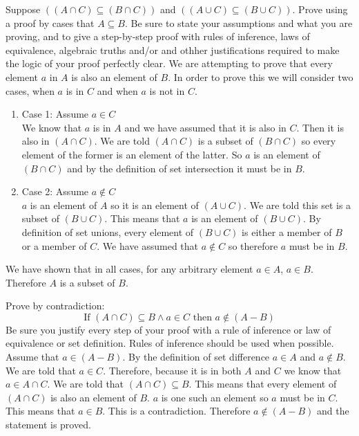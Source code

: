 \documentclass[paper=a4, fontsize=11pt]{jhwhw} %
\begin{document}
\problem{}
Suppose $((A\cap C) \subseteq (B\cap C))$ and $((A\cup C) \subseteq (B\cup C))$. Prove using a proof by cases that $A\subseteq B$. Be sure to state your assumptions and what you are proving, and to give a step-by-step proof with rules of inference, laws of equivalence, algebraic truths and/or and othher justifications required to make the logic of your proof perfectly clear.
\solution
We are attempting to prove that every element $a$ in $A$ is also an element of $B$. In order to prove this we will consider two cases, when $a$ is in $C$ and when $a$ is not in $C$. 
\begin{enumerate}
\item Case 1: Assume $a\in C$\\
We know that $a$ is in $A$ and we have assumed that it is also in $C$. Then it is also in $(A\cap C)$. We are told $(A\cap C)$ is a subset of $(B\cap C)$ so every element of the former is an element of the latter. So $a$ is an element of $(B\cap C)$ and by the definition of set intersection it must be in $B$. 
\item Case 2: Assume $a\not\in C$\\
$a$ is an element of $A$ so it is an element of $(A\cup C)$. We are told this set is a subset of $(B\cup C)$. This means that $a$ is an element of $(B\cup C)$. By definition of set unions, every element of $(B\cup C)$ is either a member of $B$ or a member of $C$. We have assumed that $a\not\in C$ so therefore $a$ must be in $B$. 
\end{enumerate}
We have shown that in all cases, for any arbitrary element $a\in A$, $a\in B$. Therefore $A$ is a subset of $B$.


\problem{}
Prove by contradiction:
$$\text{If } (A\cap C) \subseteq B \land a\in C \text{ then } a\not\in (A - B)$$
Be sure you justify every step of your proof with a rule of inference or law of equivalence or set definition. Rules of inference should be used when possible.
\solution
Assume that $a\in (A-B)$. By the definition of set difference $a\in A$ and $a\not\in B$. We are told that $a\in C$. Therefore, because it is in both $A$ and $C$ we know that $a\in A\cap C$. We are told that $(A\cap C)\subseteq B$. This means that every element of $(A\cap C)$ is also an element of $B$. $a$ is one such an element so $a$ must be in $C$. This means that $a\in B$. This is a contradiction. Therefore $a\not\in (A-B)$ and the statement is proved.
\end{document}
